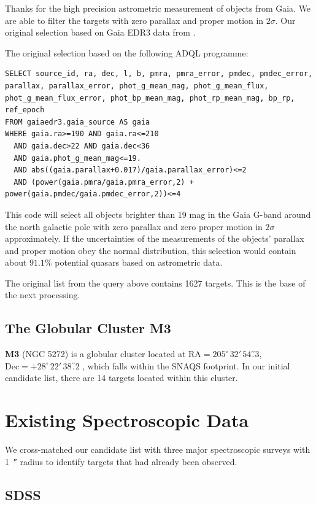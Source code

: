 Thanks for the high precision astrometric measurement of objects from Gaia. We are able to filter the targets with zero parallax and proper motion in $2\sigma$. Our original selection based on Gaia EDR3 data from \citet{gaiacollaborationGaiaEarlyData2021a}.

The original selection based on the following ADQL programme:
\begin{verbatim}
SELECT source_id, ra, dec, l, b, pmra, pmra_error, pmdec, pmdec_error, parallax, parallax_error, phot_g_mean_mag, phot_g_mean_flux, phot_g_mean_flux_error, phot_bp_mean_mag, phot_rp_mean_mag, bp_rp, ref_epoch
FROM gaiaedr3.gaia_source AS gaia 
WHERE gaia.ra>=190 AND gaia.ra<=210
  AND gaia.dec>22 AND gaia.dec<36
  AND gaia.phot_g_mean_mag<=19.
  AND abs((gaia.parallax+0.017)/gaia.parallax_error)<=2  
  AND (power(gaia.pmra/gaia.pmra_error,2) + power(gaia.pmdec/gaia.pmdec_error,2))<=4
\end{verbatim}
This code will select all objects brighter than 19 mag in the Gaia G-band around the north galactic pole with zero parallax and zero proper motion in $2\sigma$ approximately. If the uncertainties of the measurements of the objects' parallax and proper motion obey the normal distribution, this selection would contain about $91.1\%$ potential quasars based on astrometric data.

The original list from the query above contains 1627 targets. This is the base of the next processing.

\subsection{The Globular Cluster M3}

\textbf{M3} (NGC 5272) is a globular cluster located at $\text{RA} = 205^{\circ}\,32'\,54\overset{\prime\prime}{.}3$, $\text{Dec} = +28^{\circ}\,22'\,38\overset{\prime\prime}{.}2$ \citep{Goldsbury_2010}, which falls within the SNAQS footprint. In our initial candidate list, there are 14 targets located within this cluster.

\section{Existing Spectroscopic Data}

We cross-matched our candidate list with three major spectroscopic surveys with \qty{1}{\arcsecond} radius to identify targets that had already been observed. 

\subsection{SDSS}

